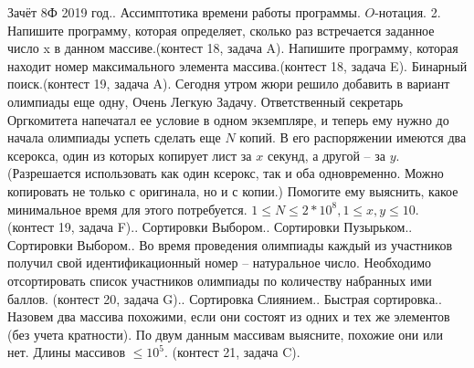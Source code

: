 \documentclass[a4paper,12pt]{article}
\begin{document}
Зачёт 8Ф 2019 год.. Ассимптотика времени работы программы. $O$-нотация.
2. Напишите программу, которая определяет, сколько раз встречается заданное число x в данном массиве.(контест 18, задача A). Напишите программу, которая находит номер максимального элемента массива.(контест 18, задача E). Бинарный поиск.(контест 19, задача A). Сегодня утром жюри решило добавить в вариант олимпиады еще одну, Очень Легкую Задачу. Ответственный секретарь Оргкомитета напечатал ее условие в одном экземпляре, и теперь ему нужно до начала олимпиады успеть сделать еще $N$ копий. В его распоряжении имеются два ксерокса, один из которых копирует лист за $x$ секунд, а другой – за $y$. (Разрешается использовать как один ксерокс, так и оба одновременно. Можно копировать не только с оригинала, но и с копии.) Помогите ему выяснить, какое минимальное время для этого потребуется. $1\le N\le 2*10^8, 1\le x, y \le 10$. (контест 19, задача F).. Сортировки Выбором.. Сортировки Пузырьком.. Сортировки Выбором.. Во время проведения олимпиады каждый из участников получил свой идентификационный номер – натуральное число. Необходимо отсортировать список участников олимпиады по количеству набранных ими баллов. (контест 20, задача G).. Сортировка Слиянием.. Быстрая сортировка.. Назовем два массива похожими, если они состоят из одних и тех же элементов (без учета кратности). По двум данным массивам выясните, похожие они или нет. Длины массивов $\le 10^5$. (контест 21, задача C).\newline
\end{document}
